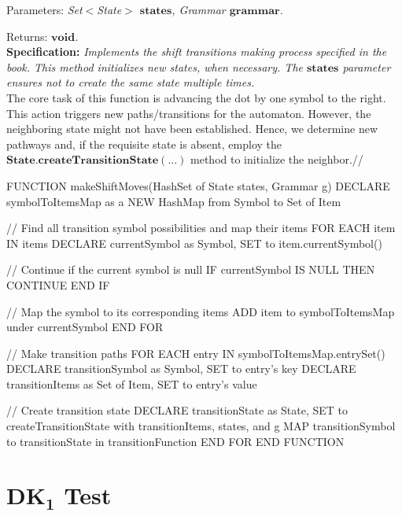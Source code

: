 Parameters: \textit{Set\(<\)State\(>\) \(\boldsymbol{states}\), Grammar \(\boldsymbol{grammar}\).}

Returns: \textit{\(\boldsymbol{void}\).}\\

\textbf{Specification:} \textit{Implements the shift transitions making process specified in the book. This method initializes new states, when necessary. The \(\boldsymbol{states}\) parameter ensures not to create the same state multiple times.}\\

The core task of this function is advancing the dot by one symbol to the right. This action triggers new paths/transitions for the automaton. However, the neighboring state might not have been established. Hence, we determine new pathways and, if the requisite state is absent, employ the \(\boldsymbol{State.createTransitionState(...)}\) method to initialize the neighbor.//

\begin{codeblock}
    FUNCTION makeShiftMoves(HashSet of State states, Grammar g)
    DECLARE symbolToItemsMap as a NEW HashMap from Symbol to Set of Item

    // Find all transition symbol possibilities and map their items
    FOR EACH item IN items
    DECLARE currentSymbol as Symbol, SET to item.currentSymbol()

    // Continue if the current symbol is null
    IF currentSymbol IS NULL THEN
    CONTINUE
    END IF

    // Map the symbol to its corresponding items
    ADD item to symbolToItemsMap under currentSymbol
    END FOR

    // Make transition paths
    FOR EACH entry IN symbolToItemsMap.entrySet()
    DECLARE transitionSymbol as Symbol, SET to entry's key
    DECLARE transitionItems as Set of Item, SET to entry's value

    // Create transition state
    DECLARE transitionState as State, SET to createTransitionState with transitionItems, states, and g
    MAP transitionSymbol to transitionState in transitionFunction
    END FOR
    END FUNCTION
\end{codeblock}

\newpage


\section{\(\boldsymbol{DK_{1}}\) Test}\label{sec:DK1 Test}

